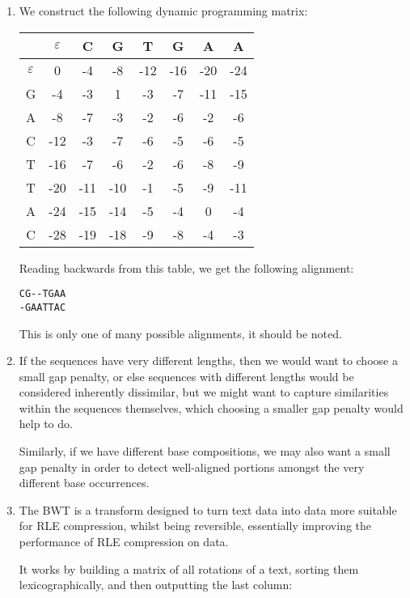 


\begin{enumerate}[label=(\alph*)]
  \item

    We construct the following dynamic programming matrix:

    \begin{tabular}{c|c|c|c|c|c|c|c}
      &$\varepsilon$&C&G&T&G&A&A\\
      \hline
      $\varepsilon$&0&-4&-8&-12&-16&-20&-24\\
      \hline
      G&-4& -3& 1& -3&-7 &-11&-15\\
      \hline
      A&-8& -7&-3&-2 &-6 &-2 &-6\\
      \hline
      C&-12&-3&-7&-6&-5  &-6 &-5 \\
      \hline
      T&-16&-7&-6&-2&-6  &-8 &-9 \\
      \hline
      T&-20&-11&-10&-1&-5&-9 &-11 \\
      \hline
      A&-24&-15&-14&-5&-4&0&-4 \\
      \hline
      C&-28&-19&-18&-9&-8&-4&-3 \\
    \end{tabular}

    Reading backwards from this table, we get the following alignment:

\begin{verbatim}
CG--TGAA
-GAATTAC
\end{verbatim}
        
This is only one of many possible alignments, it should be noted.

\item
  If the sequences have very different lengths, then we would want to choose a small gap penalty, or else sequences with different lengths would be considered inherently dissimilar, but we might want to capture similarities within the sequences themselves, which choosing a smaller gap penalty would help to do.

  Similarly, if we have different base compositions, we may also want a small gap penalty in order to detect well-aligned portions amongst the very different base occurrences.

\item
  The BWT is a transform designed to turn text data into data more suitable for RLE compression, whilst being reversible, essentially improving the performance of RLE compression on data.

  It works by building a matrix of all rotations of a text, sorting them lexicographically, and then outputting the last column:


\end{enumerate}
